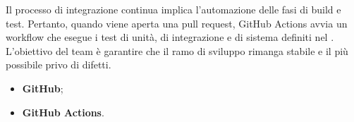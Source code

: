 \par Il processo di integrazione continua implica l’automazione delle fasi di build e test. Pertanto, quando viene aperta una pull request, GitHub Actions avvia un workflow che esegue i test di unità, di integrazione e di sistema definiti nel \PianoDiQualifica. L’obiettivo del team è garantire che il ramo di sviluppo rimanga stabile e il più possibile privo di difetti.

\begin{itemize}
  \item \textbf{GitHub};
  \item \textbf{GitHub Actions}.
\end{itemize}